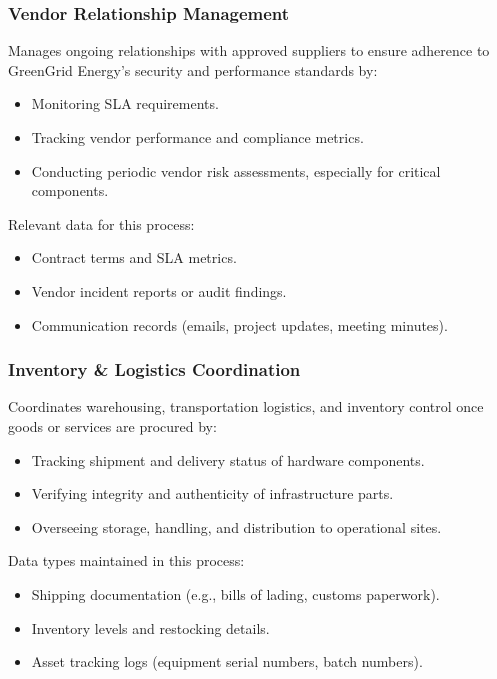 \subsubsection{Vendor Relationship Management}
Manages ongoing relationships with approved suppliers to ensure adherence to GreenGrid Energy’s
security and performance standards by:
\begin{itemize}
    \item Monitoring \ac{SLA} requirements.
    \item Tracking vendor performance and compliance metrics.
    \item Conducting periodic vendor risk assessments, especially for critical components.
\end{itemize}
\noindent
Relevant data for this process:
\begin{itemize}
    \item Contract terms and \ac{SLA} metrics.
    \item Vendor incident reports or audit findings.
    \item Communication records (emails, project updates, meeting minutes).
\end{itemize}

\subsubsection{Inventory \& Logistics Coordination}
Coordinates warehousing, transportation logistics, and inventory control once goods or
services are procured by:
\begin{itemize}
    \item Tracking shipment and delivery status of hardware components.
    \item Verifying integrity and authenticity of infrastructure parts.
    \item Overseeing storage, handling, and distribution to operational sites.
\end{itemize}
\noindent
Data types maintained in this process:
\begin{itemize}
    \item Shipping documentation (e.g., bills of lading, customs paperwork).
    \item Inventory levels and restocking details.
    \item Asset tracking logs (equipment serial numbers, batch numbers).
\end{itemize}

